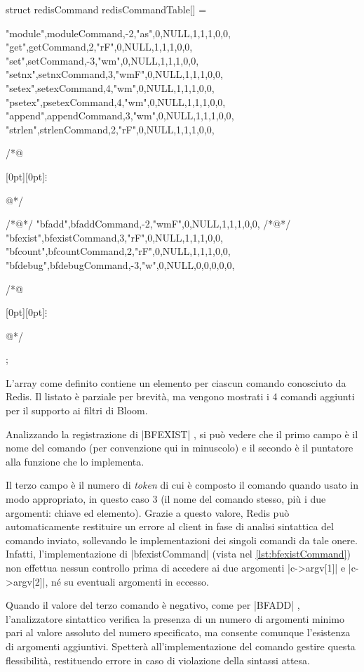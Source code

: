 \begin{commentedsource}[style=csource,caption=Registrazione nuovi comandi nella tabella co\-man\-di,label={lst:cmdtable}]
struct redisCommand redisCommandTable[] = {
    {"module",moduleCommand,-2,"as",0,NULL,1,1,1,0,0},
    {"get",getCommand,2,"rF",0,NULL,1,1,1,0,0},
    {"set",setCommand,-3,"wm",0,NULL,1,1,1,0,0},
    {"setnx",setnxCommand,3,"wmF",0,NULL,1,1,1,0,0},
    {"setex",setexCommand,4,"wm",0,NULL,1,1,1,0,0},
    {"psetex",psetexCommand,4,"wm",0,NULL,1,1,1,0,0},
    {"append",appendCommand,3,"wm",0,NULL,1,1,1,0,0},
    {"strlen",strlenCommand,2,"rF",0,NULL,1,1,1,0,0},

/*@\centerline{\raisebox{-1pt}[0pt][0pt]{$\vdots$}}@*/

/*@\lnote@*/    {"bfadd",bfaddCommand,-2,"wmF",0,NULL,1,1,1,0,0},
/*@\lnote@*/    {"bfexist",bfexistCommand,3,"rF",0,NULL,1,1,1,0,0},
    {"bfcount",bfcountCommand,2,"rF",0,NULL,1,1,1,0,0},
    {"bfdebug",bfdebugCommand,-3,"w",0,NULL,0,0,0,0,0},

/*@\centerline{\raisebox{-1pt}[0pt][0pt]{$\vdots$}}@*/

};
\end{commentedsource}

L'array come definito contiene un elemento per ciascun comando conosciuto da Redis. Il listato è
parziale per brevità, ma vengono mostrati i 4 comandi aggiunti per il supporto ai filtri di Bloom.

Analizzando la registrazione di \cverb|BFEXIST| , si può vedere che il primo campo è il nome
del comando (per convenzione qui in minuscolo) e il secondo è il puntatore alla funzione che lo
implementa.

Il terzo campo è il numero di \emph{token} di cui è composto il comando quando usato in modo
appropriato, in questo caso $3$ (il nome del comando stesso, più i due argomenti: chiave ed
elemento). Grazie a questo valore, Redis può automaticamente restituire un errore al client in fase
di analisi sintattica del comando inviato, sollevando le implementazioni dei singoli comandi da tale
onere. Infatti, l'implementazione di \cverb|bfexistCommand| (vista nel \autoref{lst:bfexistCommand})
non effettua nessun controllo prima di accedere ai due argomenti \cverb|c->argv[1]| e
\cverb|c->argv[2]|, né su eventuali argomenti in eccesso.

Quando il valore del terzo comando è negativo, come per \cverb|BFADD| , l'analizzatore
sintattico verifica la presenza di un numero di argomenti minimo pari al valore assoluto del numero
specificato, ma consente comunque l'esistenza di argomenti aggiuntivi. Spetterà all'implementazione
del comando gestire questa flessibilità, restituendo errore in caso di violazione della sintassi
attesa.

